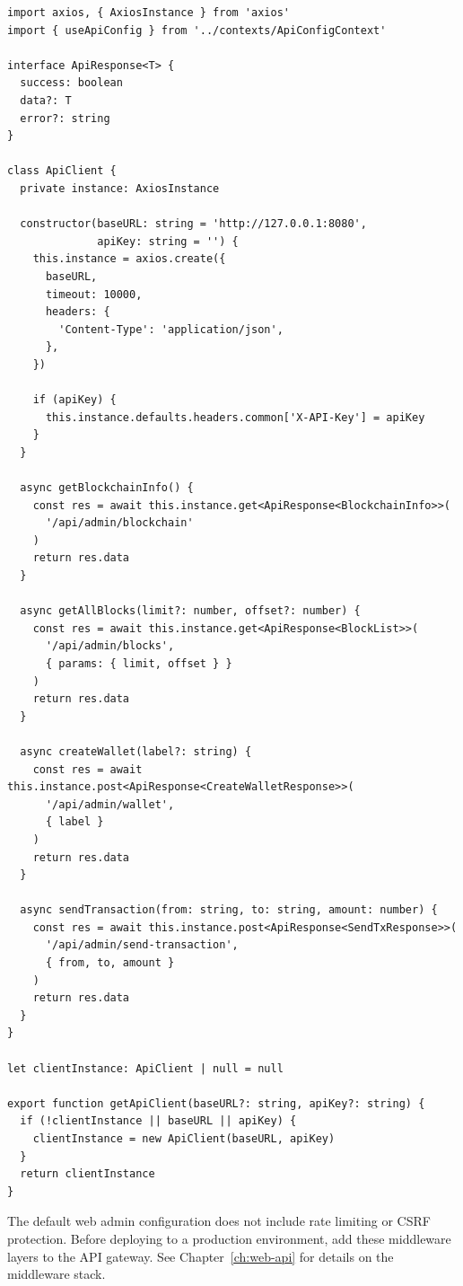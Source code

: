 \begin{listing}[htbp]
\caption{API client --- HTTP wrapper with Axios}
\label{lst:ch21-api-client}
\begin{verbatim}
import axios, { AxiosInstance } from 'axios'
import { useApiConfig } from '../contexts/ApiConfigContext'

interface ApiResponse<T> {
  success: boolean
  data?: T
  error?: string
}

class ApiClient {
  private instance: AxiosInstance

  constructor(baseURL: string = 'http://127.0.0.1:8080',
              apiKey: string = '') {
    this.instance = axios.create({
      baseURL,
      timeout: 10000,
      headers: {
        'Content-Type': 'application/json',
      },
    })

    if (apiKey) {
      this.instance.defaults.headers.common['X-API-Key'] = apiKey
    }
  }

  async getBlockchainInfo() {
    const res = await this.instance.get<ApiResponse<BlockchainInfo>>(
      '/api/admin/blockchain'
    )
    return res.data
  }

  async getAllBlocks(limit?: number, offset?: number) {
    const res = await this.instance.get<ApiResponse<BlockList>>(
      '/api/admin/blocks',
      { params: { limit, offset } }
    )
    return res.data
  }

  async createWallet(label?: string) {
    const res = await this.instance.post<ApiResponse<CreateWalletResponse>>(
      '/api/admin/wallet',
      { label }
    )
    return res.data
  }

  async sendTransaction(from: string, to: string, amount: number) {
    const res = await this.instance.post<ApiResponse<SendTxResponse>>(
      '/api/admin/send-transaction',
      { from, to, amount }
    )
    return res.data
  }
}

let clientInstance: ApiClient | null = null

export function getApiClient(baseURL?: string, apiKey?: string) {
  if (!clientInstance || baseURL || apiKey) {
    clientInstance = new ApiClient(baseURL, apiKey)
  }
  return clientInstance
}
\end{verbatim}
\end{listing}

\begin{warnbox}
The default web admin configuration does not include rate limiting or CSRF protection. Before deploying to a production environment, add these middleware layers to the API gateway. See Chapter~\ref{ch:web-api} for details on the middleware stack.
\end{warnbox}

